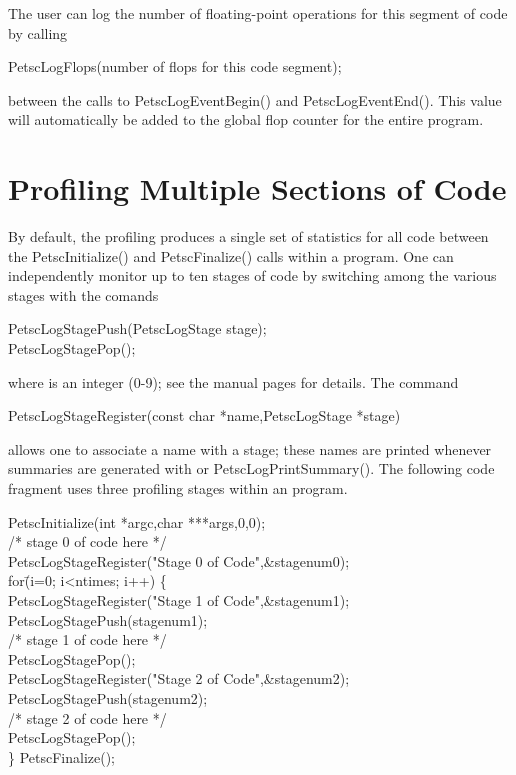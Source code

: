 {{The user can log the number of floating-point operations 
for this segment of code by calling 
\begin{tabbing}
    PetscLogFlops(number of flops for this code segment);
\end{tabbing}
between the calls to PetscLogEventBegin() and PetscLogEventEnd().
This value will automatically be added to the global flop counter for the
entire program.

\section{Profiling Multiple Sections of Code}
\label{sec_profstages}

By default, the profiling produces a single set of statistics for all
code between the PetscInitialize() and PetscFinalize()
calls within a program.  One can independently monitor up to ten
stages of code by switching among the various stages with the comands
\begin{tabbing}
   PetscLogStagePush(PetscLogStage stage);\\
   PetscLogStagePop();
\end{tabbing}
where  is an integer (0-9); see the manual pages for details.
The command 
\begin{tabbing}
   PetscLogStageRegister(const char *name,PetscLogStage *stage)
\end{tabbing}
allows one to associate a name with a stage; these names are printed whenever
summaries are generated with  or PetscLogPrintSummary().
The following code fragment uses three profiling stages within an program.

\begin{tabbing}
   PetscInitialize(int *argc,char ***args,0,0);\\
   /* stage 0 of code here */\\
   PetscLogStageRegister("Stage 0 of Code",\&stagenum0);\\
   for\= (i=0; i<ntimes; i++) \{\\
      \>PetscLogStageRegister("Stage 1 of Code",\&stagenum1);\\
      \>PetscLogStagePush(stagenum1);\\
      \>/* stage 1 of code here */\\
      \>PetscLogStagePop();\\
      \>PetscLogStageRegister("Stage 2 of Code",\&stagenum2);\\
      \>PetscLogStagePush(stagenum2);\\
      \>/* stage 2 of code here */\\
      \>PetscLogStagePop();\\
   \}
   PetscFinalize();
\end{tabbing}

}}
